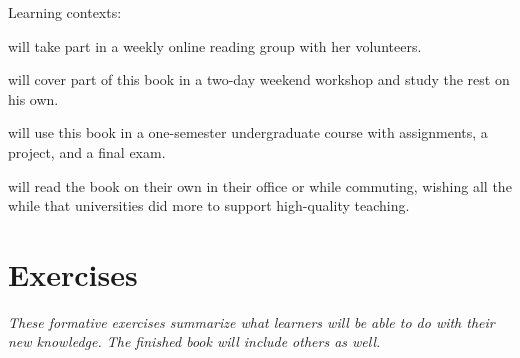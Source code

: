 Learning contexts:

\begin{description}
\tightlist
\item[Emily]
will take part in a weekly online reading group with her volunteers.
\item[Moshe]
will cover part of this book in a two-day weekend workshop and study
the rest on his own.
\item[Samira]
will use this book in a one-semester undergraduate course with
assignments, a project, and a final exam.
\item[Gene]
will read the book on their own in their office or while commuting,
wishing all the while that universities did more to support
high-quality teaching.
\end{description}

\section{Exercises}\label{exercises}

\emph{These formative exercises summarize what learners will be able to do
with their new knowledge. The finished book will include others as
well.}


